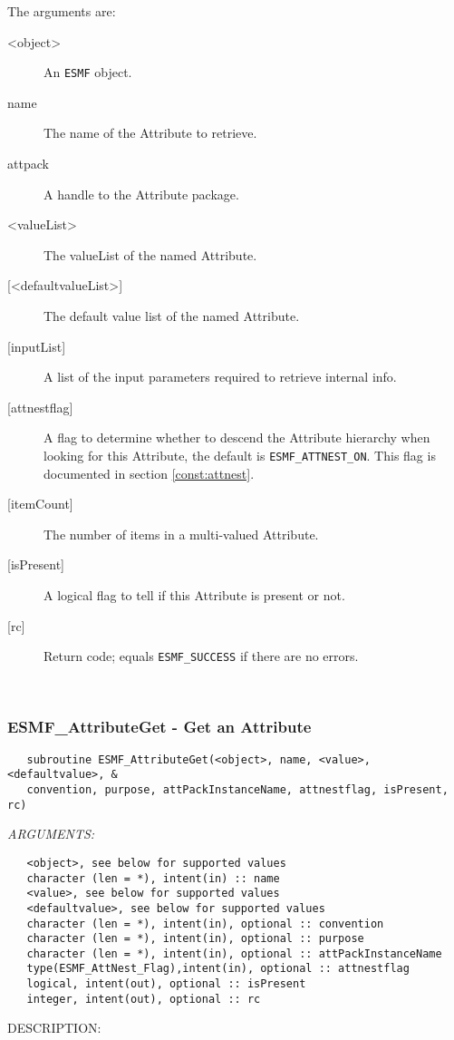    The arguments are:
   \begin{description}
   \item [<object>]
   An {\tt ESMF} object.
   \item [name]
   The name of the Attribute to retrieve.
   \item [attpack]
   A handle to the Attribute package.
   \item [<valueList>]
   The valueList of the named Attribute.
   \item [{[<defaultvalueList>]}]
   The default value list of the named Attribute.
   \item [{[inputList]}]
   A list of the input parameters required to retrieve internal info.
   \item [{[attnestflag]}]
   A flag to determine whether to descend the
   Attribute hierarchy when looking for this Attribute, the default
   is {\tt ESMF\_ATTNEST\_ON}. This flag is documented in section
   \ref{const:attnest}.
   \item [{[itemCount]}]
   The number of items in a multi-valued Attribute.
   \item [{[isPresent]}]
   A logical flag to tell if this Attribute is present or not.
   \item [{[rc]}]
   Return code; equals {\tt ESMF\_SUCCESS} if there are no errors.
   \end{description}
  
   
 
\mbox{}\hrulefill\ 
 
\subsubsection [ESMF\_AttributeGet] {ESMF\_AttributeGet - Get an Attribute}


  
\begin{verbatim}   subroutine ESMF_AttributeGet(<object>, name, <value>, <defaultvalue>, &
   convention, purpose, attPackInstanceName, attnestflag, isPresent, rc)\end{verbatim}{\em ARGUMENTS:}
\begin{verbatim}   <object>, see below for supported values
   character (len = *), intent(in) :: name
   <value>, see below for supported values
   <defaultvalue>, see below for supported values
   character (len = *), intent(in), optional :: convention
   character (len = *), intent(in), optional :: purpose
   character (len = *), intent(in), optional :: attPackInstanceName
   type(ESMF_AttNest_Flag),intent(in), optional :: attnestflag
   logical, intent(out), optional :: isPresent
   integer, intent(out), optional :: rc\end{verbatim}
{\sf DESCRIPTION:\\ }


